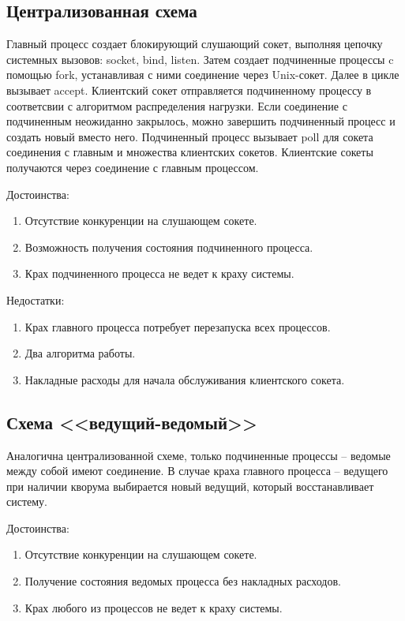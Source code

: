 \subsection{Централизованная схема}

Главный процесс создает блокирующий слушающий сокет, выполняя цепочку системных вызовов: socket, bind, listen.
Затем создает подчиненные процессы c помощью fork, устанавливая с ними соединение через Unix-сокет.
Далее в цикле вызывает accept.
Клиентский сокет отправляется подчиненному процессу в соответсвии с алгоритмом распределения нагрузки.
Если соединение с подчиненным неожиданно закрылось, можно завершить подчиненный процесс и создать новый вместо него.
Подчиненный процесс вызывает poll для сокета соединения с главным и множества клиентских сокетов.
Клиентские сокеты получаются через соединение с главным процессом.

Достоинства:
\begin{enumerate}
\item Отсутствие конкуренции на слушающем сокете.
\item Возможность получения состояния подчиненного процесса.
\item Крах подчиненного процесса не ведет к краху системы.
\end{enumerate}

Недостатки:
\begin{enumerate}
\item Крах главного процесса потребует перезапуска всех процессов.
\item Два алгоритма работы.
\item Накладные расходы для начала обслуживания клиентского сокета.
\end{enumerate}

\subsection{Схема <<ведущий-ведомый>>}

Аналогична централизованной схеме, только подчиненные процессы -- ведомые между собой имеют соединение.
В случае краха главного процесса -- ведущего при наличии кворума выбирается новый ведущий, который восстанавливает систему.

Достоинства:
\begin{enumerate}
\item Отсутствие конкуренции на слушающем сокете.
\item Получение состояния ведомых процесса без накладных расходов.
\item Крах любого из процессов не ведет к краху системы.
\end{enumerate}

